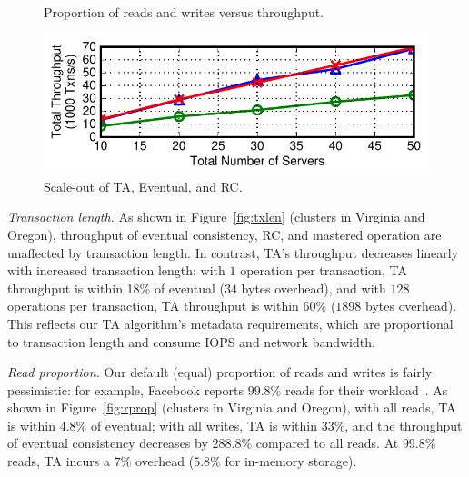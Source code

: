 \begin{figure}[t!]
\begin{center}
\end{center}\vspace{-2.25em}
\caption{Proportion of reads and writes versus throughput.}\vspace{-1em}
\label{fig:rprop}
\begin{center}
\includegraphics[width=\figfactor\columnwidth]{figs/finals/scaleout-thru.pdf}
\end{center}\vspace{-2.25em}
\caption{Scale-out of TA, Eventual, and RC.}\vspace{-1.5em}
\label{fig:scaleout}
\end{figure}

\vspace{.5em}\noindent\textit{Transaction length.} As shown in
Figure~\ref{fig:txlen} (clusters in Virginia and Oregon), throughput
of eventual consistency, RC, and mastered operation are unaffected by
transaction length. In contrast, TA's throughput decreases linearly
with increased transaction length: with $1$ operation per transaction,
TA throughput is within 18\% of eventual ($34$ bytes overhead), and
with $128$ operations per transaction, TA throughput is within $60\%$
($1898$ bytes overhead). This reflects our TA algorithm's metadata
requirements, which are proportional to transaction length and consume
IOPS and network bandwidth.


\vspace{.5em}\noindent\textit{Read proportion.} Our default (equal)
proportion of reads and writes is fairly pessimistic: for example,
Facebook reports $99.8\%$ reads for their workload~\cite{eiger}. As
shown in Figure~\ref{fig:rprop} (clusters in Virginia and Oregon),
with all reads, TA is within $4.8\%$ of eventual; with all writes, TA
is within $33\%$, and the throughput of eventual consistency decreases
by $288.8\%$ compared to all reads. At $99.8\%$ reads, TA incurs a $7\%$ overhead ($5.8\%$ for
in-memory storage).



